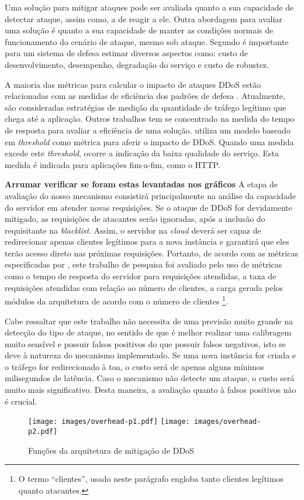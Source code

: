 

%
Uma solução para mitigar ataques pode ser avaliada quanto a sua capacidade de detectar ataque, assim como, a de reagir a ele. Outra abordagem para avaliar uma solução é quanto a sua capacidade de manter as condições normais de funcionamento do cenário de ataque, mesmo sob ataque. Segundo \cite{4600003} é importante para um sistema de defesa estimar diversos aspectos como: custo de desenvolvimento, desempenho, degradação do serviço e custo de robustez. 

A maioria das métricas para calcular o impacto de ataques DDoS estão relacionadas com as medidas de eficiência dos padrões de defesa \cite{4809152}. Atualmente, são consideradas estratégias de medição da quantidade de tráfego legítimo que chega até a aplicação. Outros trabalhos tem se concentrado na medida do tempo de resposta para avaliar a eficiência de uma solução. \cite{Mirkovic:2007:TUM:1281700.1281708} utiliza um modelo baseado em \emph{threshold} como métrica para aferir o impacto de DDoS. Quando uma medida excede este \emph{threshold}, ocorre a  indicação da baixa qualidade do serviço. Esta medida é indicada para aplicações fim-a-fim, como o HTTP.

\textbf{Arrumar verificar se foram estas levantadas nos gráficos}
A etapa de avaliação do nosso mecanismo consistirá principalmente na análise
da capacidade do servidor em atender novas requisições. Se o ataque de DDoS for devidamente
mitigado, as requisições de atacantes serão ignoradas, após a inclusão do requisitante na \emph{blacklist}. Assim, o servidor na \emph{cloud} deverá ser capaz de redirecionar apenas clientes legítimos 
para a nova instância e garantirá que eles terão acesso direto nas próximas requisições. 
Portanto, de acordo com as métricas especificadas por \cite{4600003}, este trabalho de pesquisa foi avaliado pelo uso de métricas como o tempo de resposta do servidor para requisições atendidas, a taxa de requisições atendidas com relação ao número de clientes, a carga gerada pelos módulos da arquitetura de acordo com o número de clientes \footnote{O termo ``clientes'', usado neste parágrafo engloba tanto clientes legítimos quanto atacantes.}. 

Cabe ressaltar que este trabalho não necessita de uma previsão muito grande na detecção do tipo de ataque, no sentido de que é melhor realizar uma calibragem muito sensível e possuir falsos positivos do que possuir falsos negativos, isto se deve à natureza do mecanismo implementado. Se uma nova instância for criada e o tráfego for redirecionado à toa, o custo será de apenas alguns mínimos milisegundos de latência. Caso o mecanismo não detecte um ataque, o custo será muito mais significativo. Desta maneira, a avaliação quanto à falsos positivos não é crucial. %



\begin{figure}[t!]
	\centering
	\texttt{[image: images/overhead-p1.pdf]}
	\texttt{[image: images/overhead-p2.pdf]}
	
	\caption{Funções da arquitetura de mitigação de DDoS}
\end{figure}
